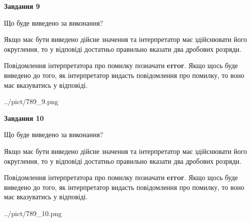 \documentclass[12pt, ukrainian]{article}
\begin{document}
{\begin {Large}
{\begin {center}\textbf{Завдання 9}\end {center}}\par
Що буде виведено за виконання? \par

Якщо має бути виведено дійсне значення та інтерпретатор має здійснювати його округлення, 
то у відповіді достатньо правильно вказати два дробових розряди.

Повідомлення інтерпретатора про помилку позначати \textbf{error}.
Якщо щось буде виведено до того, як інтерпретатор видасть повідомлення про помилку, 
то воно має вказуватись у відповіді. \par

\begin{center}
	{../pict/789_9.png}
\end{center}
\newpage

{\begin {center}\textbf{Завдання 10}\end {center}}\par
Що буде виведено за виконання? \par

Якщо має бути виведено дійсне значення та інтерпретатор має здійснювати його округлення, 
то у відповіді достатньо правильно вказати два дробових розряди.

Повідомлення інтерпретатора про помилку позначати \textbf{error}.
Якщо щось буде виведено до того, як інтерпретатор видасть повідомлення про помилку, 
то воно має вказуватись у відповіді. \par

\begin{center}
	{../pict/789_10.png}
\end{center}
\newpage

\end {Large}}
\end{document}
